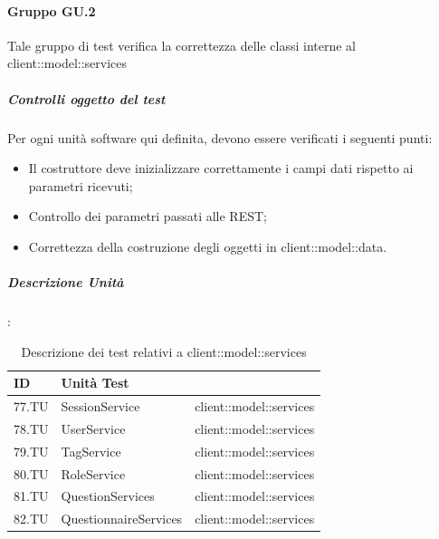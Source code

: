 \documentclass[12pt,a4paper]{article}
\begin{document}
\paragraph{Gruppo GU.2 }
Tale gruppo di test verifica la correttezza delle classi interne al  client::model::services
\subparagraph{Controlli oggetto del test}
Per ogni unità software qui definita, devono essere verificati i seguenti punti:
\begin{itemize}
	\item Il costruttore deve inizializzare correttamente i campi dati rispetto ai parametri ricevuti;
	\item Controllo dei parametri passati alle  REST;
	\item Correttezza della costruzione degli oggetti in client::model::data.
\end{itemize}
\subparagraph{Descrizione Unità}:
\begin{table}[H]
	\begin{center}
		\begin{tabular}{p{} p{} p{}}
			\toprule
			\textbf{ID}   & \textbf{Unità Test}	& \textbf{\mgls{package}} \\ \midrule
			\midrule
			77.TU & SessionService & client::model::services\\ \midrule
			78.TU & UserService & client::model::services\\ \midrule
			79.TU & TagService & client::model::services\\ \midrule
			80.TU & RoleService & client::model::services\\ \midrule
			81.TU & QuestionServices & client::model::services\\ \midrule
			82.TU & QuestionnaireServices & client::model::services\\ \midrule
			\bottomrule
		\end{tabular}
	\end{center}
	\caption{Descrizione dei test relativi a client::model::services}
\end{table}
\end{document}
